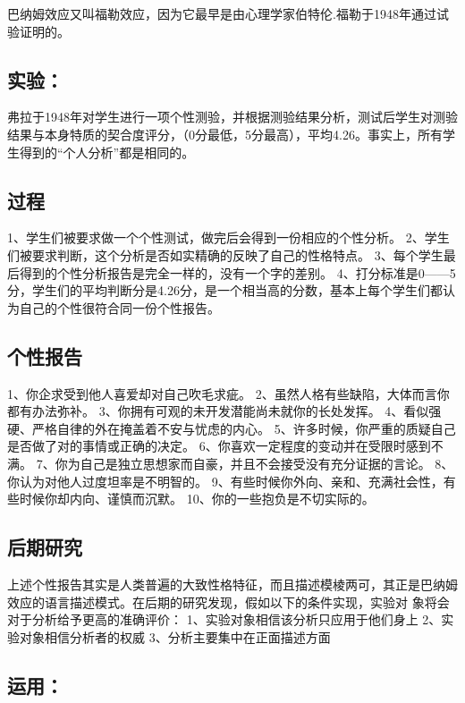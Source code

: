 \documentclass[11pt]{ctexart}
\begin{document}
巴纳姆效应又叫福勒效应，因为它最早是由心理学家伯特伦.福勒于1948年通过试验证明的。
\subsection{实验：}
\label{sec-6-1}


弗拉于1948年对学生进行一项个性测验，并根据测验结果分析，测试后学生对测验结果与本身特质的契合度评分，（0分最低，5分最高），平均4.26。事实上，所有学生得到的“个人分析”都是相同的。
\subsection{过程}
\label{sec-6-2}

1、学生们被要求做一个个性测试，做完后会得到一份相应的个性分析。
2、学生们被要求判断，这个分析是否如实精确的反映了自己的性格特点。
3、每个学生最后得到的个性分析报告是完全一样的，没有一个字的差别。
4、打分标准是0——5分，学生们的平均判断分是4.26分，是一个相当高的分数，基本上每个学生们都认为自己的个性很符合同一份个性报告。
\subsection{个性报告}
\label{sec-6-3}

1、你企求受到他人喜爱却对自己吹毛求疵。
2、虽然人格有些缺陷，大体而言你都有办法弥补。
3、你拥有可观的未开发潜能尚未就你的长处发挥。
4、看似强硬、严格自律的外在掩盖着不安与忧虑的内心。
5、许多时候，你严重的质疑自己是否做了对的事情或正确的决定。
6、你喜欢一定程度的变动并在受限时感到不满。
7、你为自己是独立思想家而自豪，并且不会接受没有充分证据的言论。
8、你认为对他人过度坦率是不明智的。
9、有些时候你外向、亲和、充满社会性，有些时候你却内向、谨慎而沉默。
10、你的一些抱负是不切实际的。
\subsection{后期研究}
\label{sec-6-4}

上述个性报告其实是人类普遍的大致性格特征，而且描述模棱两可，其正是巴纳姆效应的语言描述模式。在后期的研究发现，假如以下的条件实现，实验对
象将会对于分析给予更高的准确评价：
1、实验对象相信该分析只应用于他们身上
2、实验对象相信分析者的权威
3、分析主要集中在正面描述方面
\subsection{运用：}
\label{sec-6-5}
\end{document}
